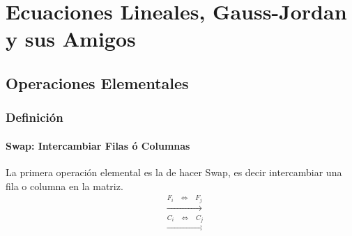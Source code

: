 \documentclass[12pt, fleqn]{report}                             %
\DeclareMathOperator \Space     {\quad}                         %
\DeclareMathOperator \MiniSpace {\;}                            %
\theoremstyle{break}                                            %
\newcommand \lEqual  {\MiniSpace \Leftrightarrow \MiniSpace}    %
\newcommand \lLongTo {\longrightarrow}                          %
\begin{document}
\part{Ecuaciones Lineales, Gauss-Jordan y sus Amigos}
\clearpage



    \clearpage
    \chapter{Operaciones Elementales}


        \clearpage
        \section{Definición}


            \subsection{Swap: Intercambiar Filas ó Columnas}

                La primera operación elemental es la de hacer Swap, es decir intercambiar una
                fila o columna en la matriz.
                \begin{align*}
                    &\overset{F_i \lEqual F_j}{\lLongTo}     \\
                    &\overset{C_i \lEqual C_j}{\lLongTo}
                \end{align*}
\end{document}
